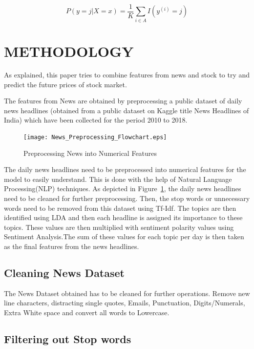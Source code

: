 \documentclass[preprint,12pt]{elsarticle}
\begin{document}
\begin{equation} 
P(y = j|X = x) = \dfrac{1}{K}\sum_{i\in A} I({y^{(i)}} = j) 
\end{equation}

\section{METHODOLOGY}
As explained, this paper tries to combine features from news and stock to try and predict the future prices of stock market. 

The features from News are obtained by preprocessing a public dataset of daily news headlines (obtained from a public dataset on Kaggle title News Headlines of India) which have been collected for the period 2010 to 2018.

\begin{figure}[H]
\centering
\texttt{[image: News\_Preprocessing\_Flowchart.eps]}
\caption{\label{fig:news_preprocessing} Preprocessing News into Numerical Features}
\end{figure}



The daily news headlines need to be preprocessed into numerical features for the model to easily understand. This is done with the help of Natural Language Processing(NLP) techniques. As depicted in Figure~\ref{fig:news_preprocessing}, the daily news headlines need to be cleaned for further preprocessing. Then, the stop words or unnecessary words need to be removed from this dataset using Tf-Idf. The topics are then identified using LDA and then each headline is assigned its importance to these topics. These values are then multiplied with sentiment polarity values using Sentiment Analysis.The sum of these values for each topic per day is then taken as the final features from the news headlines.

\subsection{Cleaning News Dataset}

The News Dataset obtained has to be cleaned for further operations. Remove new line characters, distracting single quotes, Emails, Punctuation, Digits/Numerals, Extra White space and convert all words to Lowercase.

\subsection{Filtering out Stop words}
\end{document}
